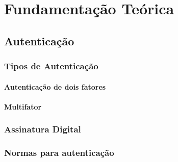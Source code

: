 \chapter{Fundamentação Teórica}\label{ch:fundamentacao-teorica}


\section{Autenticação}\label{sec:autenticacao}

\subsection{Tipos de Autenticação}\label{subsec:tipos-de-autenticacao}

\subsubsection{Autenticação de dois fatores}

\subsubsection{Multifator}

\subsection{Assinatura Digital}\label{subsec:assinatura-digital}

\subsection{Normas para autenticação}
\label{subsec:normas-para-autenticacao}

